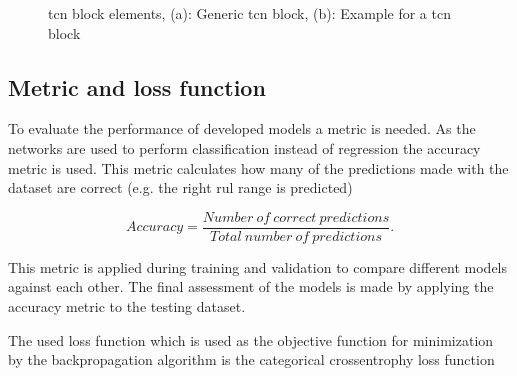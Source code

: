 \documentclass[conference]{IEEEtran}
\begin{document}
\begin{figure}[htp]
	\centering
	\quad
	\caption{\gls{tcn} block elements, (a): Generic \gls{tcn} block, (b): Example for a \gls{tcn} block \cite{Bai2018}}
	\label{fig:tcn_block}
\end{figure}



\noindent
\subsection{Metric and loss function}

To evaluate the performance of developed models a metric is needed. As the networks are used to perform classification instead of regression the accuracy metric is used. This metric calculates how many of the predictions made with the dataset are correct (e.g. the right \gls{rul} range is predicted)

\begin{equation}
	\label{eq:categorical-cross-entrophy}
	Accuracy = \frac{Number \: of \: correct \: predictions}{Total \: number \: of \: predictions}.
\end{equation}

This metric is applied during training and validation to compare different models against each other. The final assessment of the models is made by applying the accuracy metric to the testing dataset.

The used loss function which is used as the objective function for minimization by the backpropagation algorithm is the categorical crossentrophy loss function
\end{document}
